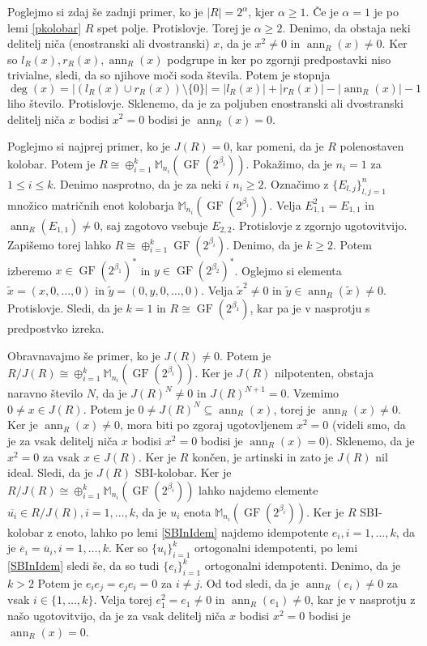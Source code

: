 \documentclass[a4paper, 12pt]{amsart}
\theoremstyle{definition} %
\theoremstyle{plain} %
\newcommand{\M}{\mathbb M}
\DeclareMathOperator{\ann}{ann}
\DeclareMathOperator{\GF}{GF}
\begin{document}
Poglejmo si zdaj še zadnji primer, ko je $|R| = 2^\alpha$, kjer $\alpha\ge 1$. Če je $\alpha = 1$ je po lemi \ref{pkolobar} $R$ spet polje. Protislovje. Torej je $\alpha \ge 2$. Denimo, da obstaja neki delitelj niča (enostranski ali dvostranski) $x$, da je $x^2 \neq 0$ in $\ann_R(x) \neq 0$. Ker so $l_R(x), r_R(x), \ann_R(x)$ podgrupe in ker po zgornji predpostavki niso trivialne, sledi, da so njihove moči soda števila. Potem je stopnja 
$$
\deg(x) = |(l_R(x) \cup r_R(x)) \setminus \{0\}| = |l_R(x) | + |r_R(x)| - |\ann_R(x)| - 1
$$
liho število. Protislovje. Sklenemo, da je za poljuben enostranski ali dvostranski delitelj niča $x$ bodisi $x^2 = 0$ bodisi je $\ann_R(x) = 0$. 

Poglejmo si najprej primer, ko je $J(R) = 0$, kar pomeni, da je $R$ polenostaven kolobar. Potem je $R\cong \oplus _{i=1}^k \M_{n_i}(\GF(2^{\beta_i}))$. Pokažimo, da je $n_i = 1$ za $1\le i \le k$. Denimo nasprotno, da je za neki $i$ $n_i\ge 2$. Označimo z $\{E_{l,j}\}_{l,j=1}^n$ množico matričnih enot kolobarja $\M_{n_i}(\GF(2^{\beta_i}))$. Velja $E_{1,1}^2 = E_{1,1}$ in $\ann_R(E_{1,1})\neq 0$, saj zagotovo vsebuje $E_{2,2}$. Protislovje z zgornjo ugotovitvijo. Zapišemo torej lahko $R\cong \oplus _{i=1}^k \GF(2^{\beta_i})$. Denimo, da je $k\ge 2$. Potem izberemo $x\in \GF(2^{\beta_1})^*$ in $y\in \GF(2^{\beta_2})^*$. Oglejmo si elementa $\tilde{x} = (x,0,\dots,0)$ in $\tilde{y} = (0,y,0,\dots,0)$. Velja $\tilde{x}^2 \neq 0$ in $\tilde{y}\in \ann_R(\tilde{x}) \neq 0$. Protislovje. Sledi, da je $k=1$ in $R\cong \GF(2^{\beta_1})$, kar pa je v nasprotju s predpostvko izreka.

Obravnavajmo še primer, ko je $J(R)\neq 0$. Potem je $R/J(R) \cong \oplus_{i=1}^k \M_{n_i}(\GF(2^{\beta_i}))$. Ker je $J(R)$ nilpotenten, obstaja naravno število $N$, da je $J(R)^N \neq 0$ in $J(R)^{N+1} = 0$. Vzemimo $0\neq x\in J(R)$. Potem je $0\neq J(R)^N \subseteq \ann_R(x)$, torej je $\ann_R(x) \neq 0$. Ker je $\ann_R(x) \neq 0$, mora biti po zgoraj ugotovljenem $x^2 = 0$ (videli smo, da je za vsak delitelj niča $x$ bodisi $x^2 = 0$ bodisi je $\ann_R(x) = 0$). Sklenemo, da je $x^2 = 0$ za vsak $x\in J(R)$. Ker je $R$ končen, je artinski in zato je $J(R)$ nil ideal. Sledi, da je $J(R)$ SBI-kolobar. Ker je $R/J(R)\cong \oplus_{i=1}^k \M_{n_i}(\GF(2^{\beta_i})) $ lahko najdemo elemente $\overline{u_i} \in R/J(R), i=1,\dots,k$, da je $u_i$ enota $\M_{n_i}(\GF(2^{\beta_i}))$. Ker je $R$ SBI-kolobar z enoto, lahko po lemi \ref{SBInIdem} najdemo idempotente $e_i, i=1,\dots,k$, da je $\overline{e}_i = \overline{u}_i, i=1,\dots,k$. Ker so $\{u_i\}_{i=1}^k$ ortogonalni idempotenti, po lemi \ref{SBInIdem} sledi še, da so tudi $\{e_i\}_{i=1}^k$ ortogonalni idempotenti.
Denimo, da je $k>2$
Potem je $e_i e_j = e_j e_i=0$ za $i\neq j$. Od tod sledi, da je $\ann_R(e_i) \neq 0$ za vsak $i\in \{1, \dots,k\}$. Velja torej $e_1^2 = e_1 \neq 0$ in $\ann_R(e_1)\neq 0$, kar je v nasprotju z našo ugotovitvijo, da je za vsak delitelj niča $x$ bodisi $x^2 = 0$ bodisi je $\ann_R(x) = 0$.
\end{document}
